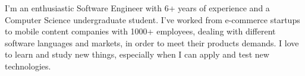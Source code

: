 %
%
%

\par{
	I'm an enthusiastic Software Engineer with 6+ years of experience
	and a Computer Science undergraduate student.
	I've worked from e-commerce startups to mobile content companies with 1000+ employees,
	dealing with different software languages and markets, in order to meet their products demands.
	I love to learn and study new things, especially when I can apply and test new technologies.\\
}
